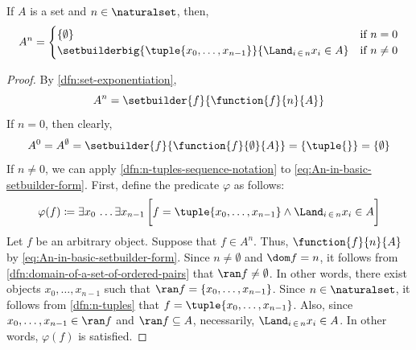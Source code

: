 \begin{thm}
    \label{thm:the-exponentiation-of-a-set-A-with-a-natural-number-as-exponent-in-set-builder-notation}
    If \( A \) is a set and \( n \in \naturalset \), then,
    \begin{equation*}
        A^{n} =
        \begin{cases}
            \mleft\{ \emptyset \mright\} & \text{\normalfont if} \ n = 0 \\
            \setbuilderbig{\tuple{x_{0}, \dots, x_{n-1}}}{\Land_{i \,\in\, n} x_{i} \in A} & \text{\normalfont if} \ n \neq 0
        \end{cases}
    \end{equation*}
\end{thm}

\begin{proof}
    By \cref{dfn:set-exponentiation},
    \begin{equation}
        \label{eq:An-in-basic-setbuilder-form}
        A^{n} = \setbuilder{f}{\function{f}{n}{A}}
    \end{equation}
    If \( n = 0 \), then clearly,
    \begin{equation*}
        A^{0} = A^{\emptyset} = \setbuilder{f}{\function{f}{\emptyset}{A}} = \mleft\{ \tuple{} \mright\} = \mleft\{ \emptyset \mright\}
    \end{equation*}
    If \( n \neq 0 \), we can apply \cref{dfn:n-tuples-sequence-notation} to \eqref{eq:An-in-basic-setbuilder-form}.
    First, define the predicate \( \varphi \) as follows:
    \begin{equation}
        \label{eq:predicate-for-tuples-with-coordinates-belonging-to-A}
        \varphi(f) \coloneq \exists x_{0} \, \dots \exists x_{n-1} \, \bigg[ f = \tuple{x_{0}, \dots, x_{n-1}} \land \Land_{i \,\in\, n} x_{i} \in A \bigg]
    \end{equation}
    Let \( f  \) be an arbitrary object. Suppose that \( f \in A^{n} \). Thus, \( \function{f}{n}{A} \) by \eqref{eq:An-in-basic-setbuilder-form}.
    Since \( n \neq \emptyset \) and \( \dom f = n \), it follows from \cref{dfn:domain-of-a-set-of-ordered-pairs} that
    \( \ran f \neq \emptyset \). In other words, there exist objects \( x_{0},\dots,x_{n-1} \) such that \( \ran f = \mleft\{ x_{0},\dots,x_{n-1} \mright\} \).
    Since \( n \in \naturalset \), it follows from \cref{dfn:n-tuples} that
    \( f = \tuple{x_{0}, \dots, x_{n-1}} \). Also, since \( x_{0},\dots,x_{n-1} \in \ran f \) and
    \( \ran f \subseteq A \), necessarily, \( \Land_{i \,\in\, n} x_{i} \in A \). In other words, \( \varphi(f) \) is satisfied.

\end{proof}
